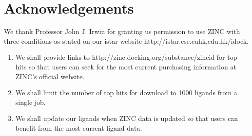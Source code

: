 \section{Acknowledgements}

We thank Professor John J. Irwin for granting us permission to use ZINC \cite{532,1178} with three conditions as stated on our istar website http://istar.cse.cuhk.edu.hk/idock.
\begin{enumerate}
\item We shall provide links to http://zinc.docking.org/substance/zincid for top hits so that users can seek for the most current purchasing information at ZINC's official website.
\item We shall limit the number of top hits for download to 1000 ligands from a single job.
\item We shall update our ligands when ZINC data is updated so that users can benefit from the most current ligand data.
\end{enumerate}

\chapterend
